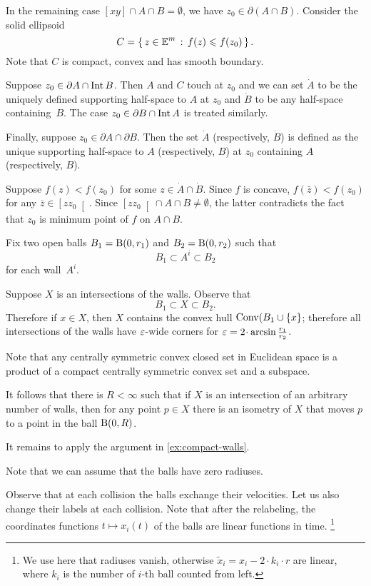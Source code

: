 In the remaining case $[xy]\cap A\cap B=\emptyset$, 
we have $z_0\in\partial (A\cap B)$.  
Consider the solid ellipsoid
\[C=\left\{\,{z\in\mathbb{E}^m}\,:\,{f(z)\leqslant f(z_0)}\,\right\}.\] 
Note that $C$ is compact, convex and has  smooth boundary. 

Suppose $z_0\in\partial  A \cap \operatorname{\rm Int}\nolimits B$. 
Then $A$ and $C$ touch at $z_0$ and we can set $\dot A$ to be the uniquely defined supporting half-space to $A$  at $z_0$ and $\dot B$ to be any half-space containing~$B$. 
The case $z_0\in\partial B \cap \operatorname{\rm Int}\nolimits A$ is treated similarly.


Finally, suppose $z_0\in\partial A\cap\partial B$. 
Then the set  $\dot A$ (respectively, $\dot B$) is defined as the unique supporting half-space to $A$ (respectively, $B$) at $z_0$ containing $A$ (respectively, $B$).

Suppose $f(z)<f(z_0)$ for some $z\in \dot A\cap\dot B$.
Since $f$ is concave,
$f(\bar z)<f(z_0)$ for any $\bar z \in \left[zz_0\right[$.
Since $\left[zz_0\right[\cap A\cap B\ne\emptyset$,
the latter contradicts the fact that $z_0$ is minimum point of $f$ on $A\cap B$.


Fix two open balls $B_1\z=\oBall(0,r_1)$ and $B_2=\mathrm{B}{}(0,r_2)$
such that 
\[B_1\subset A^i\subset B_2\]
for each wall~$A^i$.

Suppose $X$ is an intersections of  the walls.
Observe that 
\[B_1\subset X\subset B_2.\]
Therefore if $x\in X$, then $X$ contains the convex hull $\mathop{\rm Conv}\nolimits(B_1\cup\{x\}$;
therefore all intersections of the walls have $\varepsilon$-wide corners for $\eps\z=2\cdot \arcsin\tfrac{r_1}{r_2}$.

Note that any centrally symmetric convex closed set in Euclidean space is a product of a compact centrally symmetric convex set and a subspace.

It follows that there is $R<\infty$
such that if $X$ is an intersection of an arbitrary number of walls, then for any point $p\in X$ there is an isometry of $X$ 
that moves  $p$ to a point in the ball $\mathrm{B}{}(0,R)$.

It remains to apply the argument in \ref{ex:compact-walls}.

Note that we can assume that the balls have zero radiuses.

Observe that at each collision the balls exchange their velocities.
Let us also change their labels at each collision.
Note that after the relabeling,  the coordinates functions $t\mapsto x_{i}(t)$ of the balls are linear functions in time.%
\footnote{We use here that radiuses vanish, otherwise $\tilde x_i=x_i-2\cdot k_i\cdot r$ are linear, where $k_i$ is the number of $i$-th ball counted from left.} 

